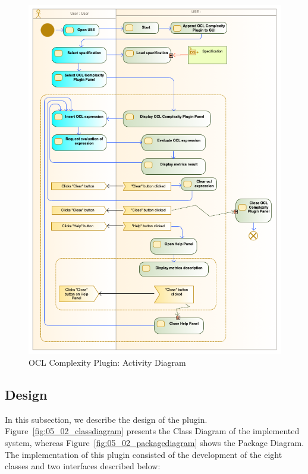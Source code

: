 \begin{figure}[ht]
    \centering
    \includegraphics[width=1\textwidth]{Chapters/figures/5_Implementation/02_ActivityDiagram}
    \caption{OCL Complexity Plugin: Activity Diagram}
    \label{fig:05_02_activitydiagram}
\end{figure}

\subsection{Design}

In this subsection, we describe the design of the plugin. Figure~\ref{fig:05_02_classdiagram} presents the Class Diagram of the implemented system, whereas Figure~\ref{fig:05_02_packagediagram} shows the Package Diagram. The implementation of this plugin consisted of the development of the eight classes and two interfaces described below: 

